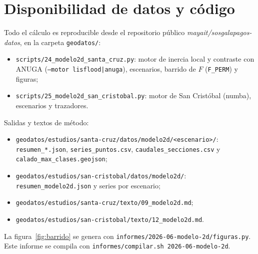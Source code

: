 \documentclass{sosg-informe}
\begin{document}
\section*{Disponibilidad de datos y código}
{\small\sloppy Todo el cálculo es reproducible desde el repositorio público \emph{mayait/sosgalapagos-datos}, en la carpeta \texttt{geodatos/}:
\begin{itemize}
  \item \texttt{scripts/24\_modelo2d\_santa\_cruz.py}: motor de inercia local y contraste con ANUGA (\texttt{--motor lisflood|anuga}), escenarios, barrido de $F$ (\texttt{F\_PERM}) y figuras;
  \item \texttt{scripts/25\_modelo2d\_san\_cristobal.py}: motor de San Cristóbal (numba), escenarios y trazadores.
\end{itemize}
Salidas y textos de método:
\begin{itemize}
  \item \texttt{geodatos/estudios/santa-cruz/datos/modelo2d/<escenario>/}: \texttt{resumen\_*.json}, \texttt{series\_puntos.csv}, \texttt{caudales\_secciones.csv} y \texttt{calado\_max\_clases.geojson};
  \item \texttt{geodatos/estudios/san-cristobal/datos/modelo2d/}: \texttt{resumen\_modelo2d.json} y series por escenario;
  \item \texttt{geodatos/estudios/santa-cruz/texto/09\_modelo2d.md};
  \item \texttt{geodatos/estudios/san-cristobal/texto/12\_modelo2d.md}.
\end{itemize} La figura~\ref{fig:barrido} se genera con \texttt{informes/2026-06-modelo-2d/figuras.py}. Este informe se compila con \texttt{informes/compilar.sh 2026-06-modelo-2d}.\par}



\end{document}
